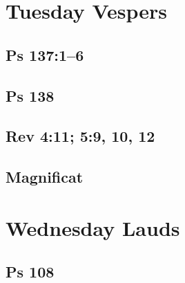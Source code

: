 \section{Tuesday Vespers}

\subsection{Ps 137:1--6}

{%
\parindent 0pt
\noindent
\ifx\preLilyPondExample \undefined
\else
  \expandafter\preLilyPondExample
\fi
\def\lilypondbook{}%

\ifx\postLilyPondExample \undefined
\else
  \expandafter\postLilyPondExample
\fi
}

\subsection{Ps 138}

{%
\parindent 0pt
\noindent
\ifx\preLilyPondExample \undefined
\else
  \expandafter\preLilyPondExample
\fi
\def\lilypondbook{}%

\ifx\postLilyPondExample \undefined
\else
  \expandafter\postLilyPondExample
\fi
}

\subsection{Rev 4:11; 5:9, 10, 12}

{%
\parindent 0pt
\noindent
\ifx\preLilyPondExample \undefined
\else
  \expandafter\preLilyPondExample
\fi
\def\lilypondbook{}%

\ifx\postLilyPondExample \undefined
\else
  \expandafter\postLilyPondExample
\fi
}

\subsection{Magnificat}

{%
\parindent 0pt
\noindent
\ifx\preLilyPondExample \undefined
\else
  \expandafter\preLilyPondExample
\fi
\def\lilypondbook{}%

\ifx\postLilyPondExample \undefined
\else
  \expandafter\postLilyPondExample
\fi
}


\section{Wednesday Lauds}

\subsection{Ps 108}


